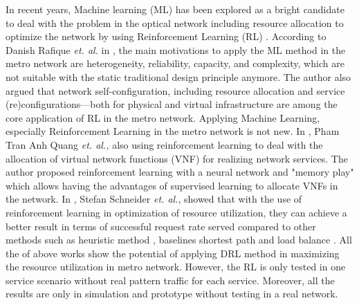 \documentclass[conference]{IEEEtran}
\begin{document}
In recent years, Machine learning (ML) has been explored as a bright candidate to deal with the problem in the optical network including resource allocation to optimize the network by using Reinforcement Learning (RL) \cite{Gu2020}. According to Danish Rafique \textit{et. al.} in \cite{Rafique:18}, the main motivations to apply the ML method in the metro network are heterogeneity, reliability, capacity, and complexity, which are not suitable with the static traditional design principle anymore. The author also argued that network self-configuration, including resource allocation and service (re)configurations—both for physical and virtual infrastructure are among the core application of RL in the metro network. Applying Machine Learning, especially Reinforcement Learning in the metro network is not new. In \cite{8873660}, Pham Tran Anh Quang \textit{et. al.,} also using reinforcement learning to deal with the allocation of virtual network functions (VNF) for realizing network services. The author proposed reinforcement learning with a neural network and "memory play" which allows having the advantages of supervised learning to allocate VNFs in the network. In \cite{9269087}, Stefan Schneider \textit{et. al.}, showed that with the use of reinforcement learning in optimization of resource utilization, they can achieve a better result in terms of successful request rate served compared to other methods such as heuristic method \cite{8459915}, baselines shortest path and load balance \cite{8485853}. All the of above works show the potential of applying DRL method in maximizing the resource utilization in metro network. However, the RL is only tested in one service scenario without real pattern traffic for each service. Moreover, all the results are only in simulation and prototype without testing in a real network. 
\end{document}
